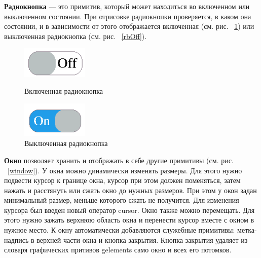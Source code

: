\documentclass[14pt]{extarticle}
\begin{document}
		
		\textbf{Радиокнопка} --- это примитив, который может находиться во включенном или выключенном состоянии. При отрисовке радиокнопки проверяется, в каком она состоянии, и в зависимости от этого отображается включенная (см. рис. ~\ref{rbOn}) или выключенная радиокнопка (см. рис. ~\ref{rbOff}).
		\begin{figure}[h]
		\begin{center}
		\begin{minipage}[h]{0.4\linewidth}
		\includegraphics[width=90pt]{pictures/toggleButton1.png}
		\caption{ Включенная радиокнопка} %
		\label{rbOff} %
		\end{minipage}
		\hfill 
		\begin{minipage}[h]{0.4\linewidth}
		\includegraphics[width=90pt]{pictures/toggleButton2.png}
		\caption{Выключенная радиокнопка}
		\label{rbOn}
		\end{minipage}
		\end{center}
		\end{figure}
		
		\pagebreak
	\textbf{Окно} позволяет хранить и отображать в себе другие примитивы (см. рис. ~\ref{window}). У окна можно динамически изменять размеры. Для этого нужно подвести курсор к границе окна, курсор при этом должен поменяться, затем нажать и расстянуть или сжать окно до нужных размеров. При этом у окон задан минимальный размер, меньше которого сжать не получится. Для изменения курсора был введен новый оператор cursor. Окно также можно перемещать. Для этого нужно зажать верхнюю область окна и перенести курсор вместе с окном в нужное место. К окну автоматически добавляются служебные примитивы: метка-надпись в верхней части окна и кнопка закрытия. Кнопка закрытия удаляет из словаря графических притивов gelements само окно и всех его потомков.
			
\end{document}
